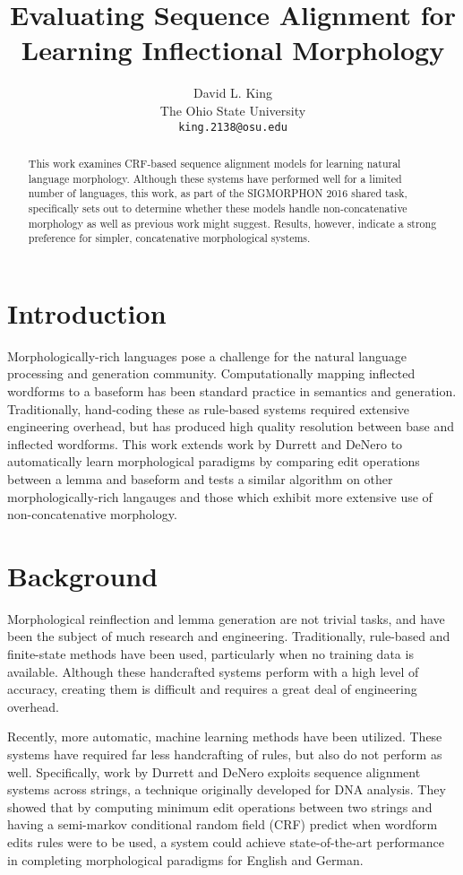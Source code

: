 \documentclass[11pt]{article}
\title{Evaluating Sequence Alignment for Learning Inflectional Morphology}
\author{David L. King\\
  The Ohio State University\\
  {\tt king.2138@osu.edu}}
\date{}
\begin{document}
\maketitle
\begin{abstract}
This work examines CRF-based sequence alignment models for learning natural language morphology. Although these systems have performed well for a limited number of languages, this work, as part of the SIGMORPHON 2016 shared task, specifically sets out to determine whether these models handle non-concatenative morphology as well as previous work might suggest. Results, however, indicate a strong preference for simpler, concatenative morphological systems.
\end{abstract}

\section*{Introduction}
Morphologically-rich languages pose a challenge for the natural language processing and generation community. 
Computationally mapping inflected wordforms to a baseform has been standard practice in semantics and generation.
Traditionally, hand-coding these as rule-based systems required extensive engineering overhead, but has produced high quality resolution between base and inflected wordforms. 
This work extends work by Durrett and DeNero  to automatically learn morphological paradigms by comparing edit operations between a lemma and baseform and tests a similar algorithm on other morphologically-rich langauges and those which exhibit more extensive use of non-concatenative morphology. 

\section*{Background}
Morphological reinflection and lemma generation are not trivial tasks, and have been the subject of much research and engineering. 
Traditionally, rule-based and finite-state methods \cite{minnen2001applied,koskenniemi1984general} have been used, particularly when no training data is available. 
Although these handcrafted systems perform with a high level of accuracy, creating them is difficult and requires a great deal of engineering overhead. 

Recently, more automatic, machine learning methods have been utilized. 
These systems have required far less handcrafting of rules, but also do not perform as well. 
Specifically, work by Durrett and DeNero  exploits sequence alignment systems across strings, a technique originally developed for DNA analysis. They showed that by computing minimum edit operations between two strings and having a semi-markov conditional random field (CRF) \cite{sarawagi2004semi} predict when wordform edits rules were to be used, a system could achieve state-of-the-art performance in completing morphological paradigms for English and German. 
\end{document}
